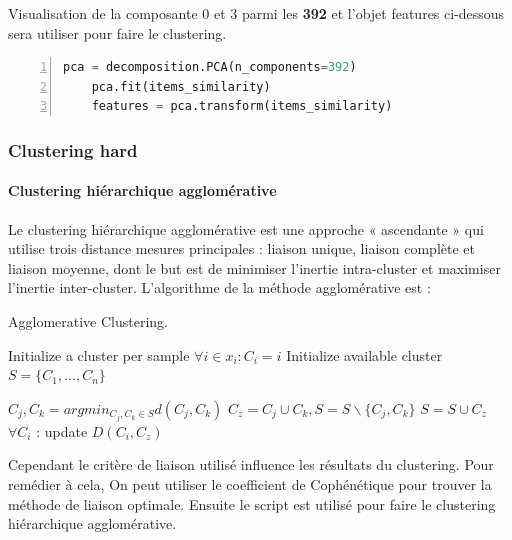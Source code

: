 Visualisation de la composante 0 et 3 parmi les \textbf{392} et l’objet \colorbox{gray!30}{features} ci-dessous sera utiliser pour faire le clustering.
\begin{lstlisting}[language=Python,label={pca_code}, basicstyle=\scriptsize, frame=l,framesep=4.5mm,framexleftmargin=2.5mm,tabsize=2,numbers=left,fillcolor=\color{blueforest!70},rulecolor=\color{blueforest},numberstyle=\normalfont\tiny\color{white}]
	pca = decomposition.PCA(n_components=392)
	pca.fit(items_similarity)
	features = pca.transform(items_similarity)
\end{lstlisting}

\subsubsection{Clustering hard}

\paragraph{Clustering hiérarchique agglomérative}

Le clustering hiérarchique agglomérative est une approche « ascendante » qui utilise trois distance mesures principales : liaison unique, liaison complète et liaison moyenne, dont le but est de minimiser l’inertie intra-cluster et maximiser l’inertie inter-cluster. L’algorithme de la méthode agglomérative est :

\begin{algorithm}[H]
	\caption{Agglomerative Clustering.}
	\begin{algorithmic}[1]
	
		\State Initialize a cluster per sample $ \forall i \in x_{i} : C_{i} = i $
		\State Initialize available cluster $S = \{C_{1},...,C_{n}\}$
		
			\State $C_{j}, C_{k} = argmin_{C_{j},C_{k} \in S} d(C_{j}, C_{k})$  
			\State $C_{z} = C_{j} \cup C_{k}, S = S \backslash \{ C_{j},C_{k} \} $ 
				\State $S = S \cup C_{z}$
			\EndIf
			\State $\forall C_{i}$ : update $D(C_{i},C_{z})$ 
		\EndWhile 
	\EndProcedure
	
	\end{algorithmic}
\end{algorithm}
Cependant le critère de liaison utilisé influence les résultats du clustering. Pour remédier à cela, On peut utiliser le coefficient de Cophénétique pour trouver la méthode de liaison optimale. Ensuite le script est utilisé pour faire le clustering hiérarchique agglomérative.

